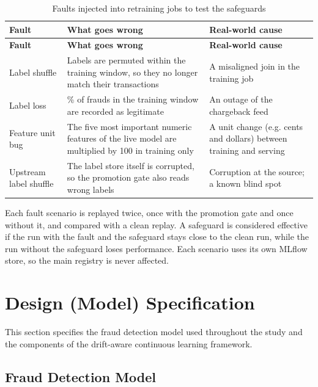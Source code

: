 {\footnotesize
\begin{longtable}{>{\raggedright\arraybackslash}p{}>{\raggedright\arraybackslash}p{}>{\raggedright\arraybackslash}p{}}
\caption{Faults injected into retraining jobs to test the safeguards}\label{tab:faults}\\
\toprule
\textbf{Fault} & \textbf{What goes wrong} & \textbf{Real-world cause} \\
\midrule
\endfirsthead
\toprule
\textbf{Fault} & \textbf{What goes wrong} & \textbf{Real-world cause} \\
\midrule
\endhead
Label shuffle & Labels are permuted within the training window, so they no longer match their transactions & A misaligned join in the training job \\ \midrule
Label loss & 80\% of frauds in the training window are recorded as legitimate & An outage of the chargeback feed \\ \midrule
Feature unit bug & The five most important numeric features of the live model are multiplied by 100 in training only & A unit change (e.g. cents and dollars) between training and serving \\ \midrule
Upstream label shuffle & The label store itself is corrupted, so the promotion gate also reads wrong labels & Corruption at the source; a known blind spot \\ \bottomrule
\end{longtable}
}

Each fault scenario is replayed twice, once with the promotion gate and once without it, and compared with a clean replay. A safeguard is considered effective if the run with the fault and the safeguard stays close to the clean run, while the run without the safeguard loses performance. Each scenario uses its own MLflow store, so the main registry is never affected.

\section{Design (Model) Specification}\label{sec:spec}

This section specifies the fraud detection model used throughout the study and the components of the drift-aware continuous learning framework.

\subsection{Fraud Detection Model}\label{sec:model}

